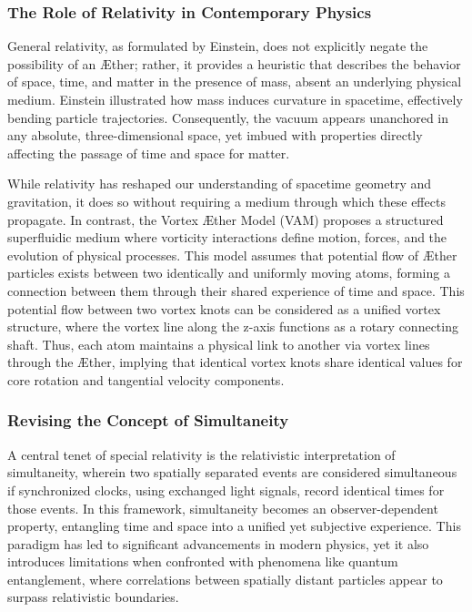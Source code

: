 \subsubsection*{The Role of Relativity in Contemporary Physics}
General relativity, as formulated by Einstein, does not explicitly negate the possibility of an \AE ther; rather, it provides a heuristic that describes the behavior of space, time, and matter in the presence of mass, absent an underlying physical medium.
Einstein illustrated how mass induces curvature in spacetime, effectively bending particle trajectories.
Consequently, the vacuum appears unanchored in any absolute, three-dimensional space, yet imbued with properties directly affecting the passage of time and space for matter.

While relativity has reshaped our understanding of spacetime geometry and gravitation, it does so without requiring a medium through which these effects propagate.
In contrast, the Vortex \AE ther Model (VAM) proposes a structured superfluidic medium where vorticity interactions define motion, forces, and the evolution of physical processes.
This model assumes that potential flow of \AE ther particles exists between two identically and uniformly moving atoms, forming a connection between them through their shared experience of time and space.
This potential flow between two vortex knots can be considered as a unified vortex structure, where the vortex line along the z-axis functions as a rotary connecting shaft.
Thus, each atom maintains a physical link to another via vortex lines through the \AE ther, implying that identical vortex knots share identical values for core rotation and tangential velocity components.

\subsubsection*{Revising the Concept of Simultaneity}
A central tenet of special relativity is the relativistic interpretation of simultaneity, wherein two spatially separated events are considered simultaneous if synchronized clocks, using exchanged light signals, record identical times for those events.
In this framework, simultaneity becomes an observer-dependent property, entangling time and space into a unified yet subjective experience.
This paradigm has led to significant advancements in modern physics, yet it also introduces limitations when confronted with phenomena like quantum entanglement, where correlations between spatially distant particles appear to surpass relativistic boundaries.


